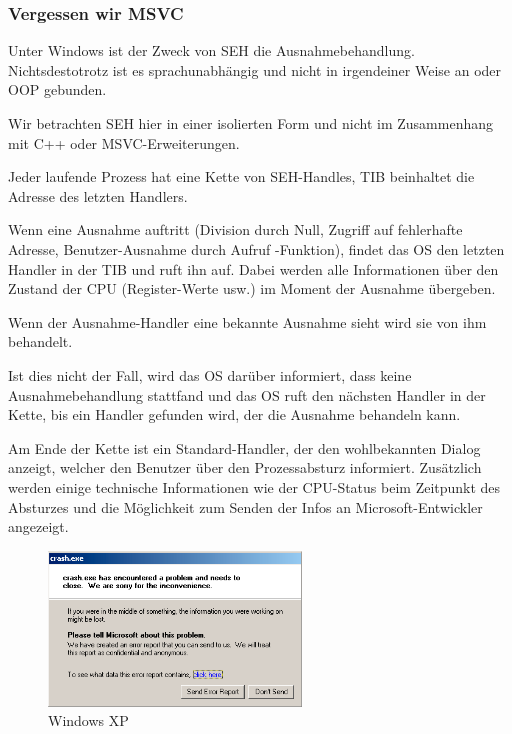 \subsubsection{Vergessen wir MSVC}

Unter Windows ist der Zweck von \ac{SEH} die Ausnahmebehandlung. Nichtsdestotrotz
ist es sprachunabhängig und nicht in irgendeiner Weise an \Cpp oder \ac{OOP} gebunden.

Wir betrachten \ac{SEH} hier in einer isolierten Form und nicht im Zusammenhang mit
C++ oder MSVC-Erweiterungen.


Jeder laufende Prozess hat eine Kette von \ac{SEH}-Handles, \ac{TIB} beinhaltet die Adresse
des letzten Handlers.

Wenn eine Ausnahme auftritt (Division durch Null, Zugriff auf fehlerhafte Adresse,
Benutzer-Ausnahme durch Aufruf -Funktion), findet das \ac{OS} 
den letzten Handler in der \ac{TIB} und ruft ihn auf. Dabei werden alle Informationen
über den Zustand der \ac{CPU} (Register-Werte usw.) im Moment der Ausnahme übergeben.

Wenn der Ausnahme-Handler eine bekannte Ausnahme sieht wird sie von ihm behandelt.

Ist dies nicht der Fall, wird das \ac{OS} darüber informiert, dass keine Ausnahmebehandlung
stattfand und das \ac{OS} ruft den nächsten Handler in der Kette, bis ein Handler
gefunden wird, der die Ausnahme behandeln kann.

Am Ende der Kette ist ein Standard-Handler, der den wohlbekannten Dialog anzeigt,
welcher den Benutzer über den Prozessabsturz informiert. Zusätzlich werden einige
technische Informationen wie der \ac{CPU}-Status beim Zeitpunkt des Absturzes
und die Möglichkeit zum Senden der Infos an Microsoft-Entwickler angezeigt.

\begin{figure}[H]
\centering
\includegraphics[width=0.6\textwidth]{OS/SEH/1/crash_xp1.png}
\caption{Windows XP}
\end{figure}

